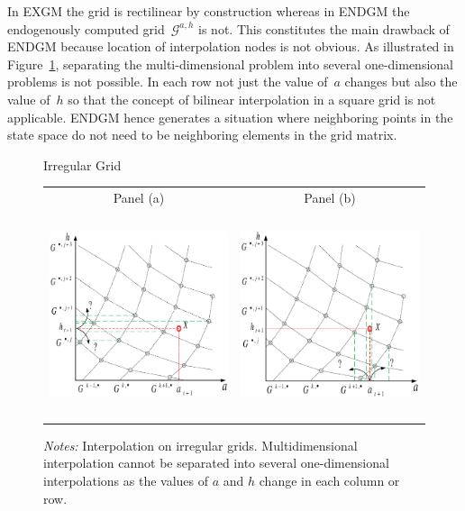 \documentclass[a4paper,12pt]{article}
\begin{document}
In EXGM the grid is rectilinear by construction whereas in ENDGM the endogenously computed grid~$\mathcal{G}^{a,h}$ is not. This constitutes the main drawback of ENDGM because location of interpolation nodes is not obvious. As illustrated in Figure~\ref{Irregular_Grid}, separating the multi-dimensional problem into several one-dimensional problems is not possible. In each row not just the value of~$a$ changes but also the value of~$h$ so that the concept of bilinear interpolation in a square grid is not applicable. ENDGM hence generates a situation where neighboring points in the state space do not need to be neighboring elements in the grid matrix. 
\begin{figure}[htb] 
	\caption{Irregular Grid}
	\label{Irregular_Grid}
	\centering
	\begin{tabular}{cc}
		Panel (a) & Panel (b) \\
		\includegraphics[height=6.0cm, width=7.5cm]{Abbildungen/endo_grid_1.eps} & \includegraphics[height=6.0cm, width=7.5cm]{Abbildungen/endo_grid_2.eps} \\
	\end{tabular}
	\caption*{\footnotesize{\emph{Notes:} Interpolation on irregular grids. Multidimensional interpolation cannot be separated into several one-dimensional interpolations as the values of $a$ and $h$ change in each column or row.}}
\end{figure}
\end{document}
